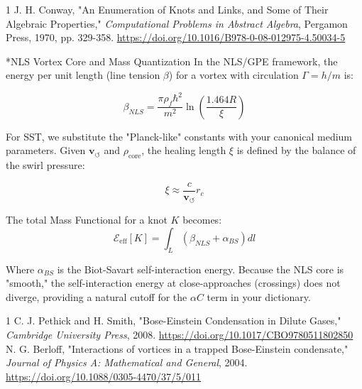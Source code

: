 \documentclass[11pt]{article}
\begin{document}
            \begin{thebibliography}{1}
                J. H. Conway, "An Enumeration of Knots and Links, and Some of Their Algebraic Properties,"
                \textit{Computational Problems in Abstract Algebra}, Pergamon Press, 1970, pp. 329-358.
                \url{https://doi.org/10.1016/B978-0-08-012975-4.50034-5}
            \end{thebibliography}


            \begin{section}*{NLS Vortex Core and Mass Quantization}
                In the NLS/GPE framework, the energy per unit length (line tension $\beta$) for a vortex with circulation $\Gamma = h/m$ is:

                \begin{equation}
                    \beta_{NLS} = \frac{\pi \rho_{\!f} \hbar^2}{m^2} \ln\left( \frac{1.464 R}{\xi} \right)
                \end{equation}

                For SST, we substitute the "Planck-like" constants with your canonical medium parameters. Given $\mathbf{v}_{\!\boldsymbol{\circlearrowleft}}$ and $\rho_{\text{core}}$, the healing length $\xi$ is defined by the balance of the swirl pressure:

                \begin{equation}
                    \xi \approx \frac{c}{\mathbf{v}_{\!\boldsymbol{\circlearrowleft}}} r_c
                \end{equation}

                The total Mass Functional for a knot $K$ becomes:
                \begin{equation}
                    \mathcal{E}_{\text{eff}}[K] = \int_{L} \left( \beta_{NLS} + \alpha_{BS} \right) dl
                \end{equation}

                Where $\alpha_{BS}$ is the Biot-Savart self-interaction energy. Because the NLS core is "smooth," the self-interaction energy at close-approaches (crossings) does not diverge, providing a natural cutoff for the $\alpha C$ term in your dictionary.
            \end{section}

            \begin{thebibliography}{1}
                C. J. Pethick and H. Smith, "Bose-Einstein Condensation in Dilute Gases,"
                \textit{Cambridge University Press}, 2008. \url{https://doi.org/10.1017/CBO9780511802850}
                N. G. Berloff, "Interactions of vortices in a trapped Bose-Einstein condensate,"
                \textit{Journal of Physics A: Mathematical and General}, 2004. \url{https://doi.org/10.1088/0305-4470/37/5/011}
            \end{thebibliography}
\end{document}
